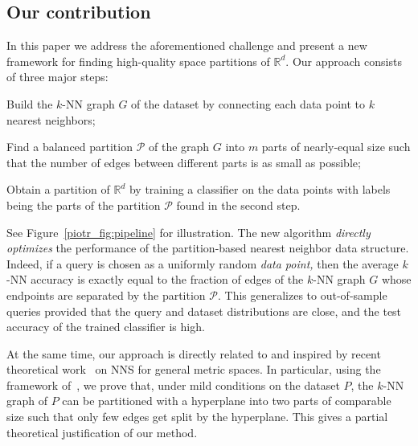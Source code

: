 \documentclass[11pt]{article}
\begin{document}
\subsection{Our contribution}

In this paper we address the aforementioned challenge and present a new framework for finding high-quality space partitions of $\mathbb{R}^d$.
Our approach consists of three major steps:
\begin{CompactEnumerate}
\item Build the $k$-NN graph $G$ of the dataset by connecting each data point to $k$ nearest neighbors;
\item Find a balanced partition $\mathcal{P}$ of the graph $G$ into $m$ parts of nearly-equal size such that the number of edges between different parts is as small as possible;
\item Obtain a partition of $\mathbb{R}^d$ by training a classifier on the data points with labels being the parts of the partition $\mathcal{P}$ found in the second step.
\end{CompactEnumerate}

See Figure~\ref{piotr_fig:pipeline} for illustration.
The new algorithm \emph{directly optimizes} the performance of the partition-based nearest neighbor data structure.
Indeed, if a query is chosen as a uniformly random \emph{data point,} then the average $k$-NN accuracy is exactly equal to the fraction of edges of the $k$-NN
graph $G$ whose endpoints are separated by the partition $\mathcal{P}$. This generalizes to out-of-sample queries provided that
the query and dataset distributions are close, and the test accuracy of the trained classifier is high.

At the same time, our approach is directly related to and inspired by recent theoretical work~\cite{andoni2018data,andoni2018holder} on NNS for general metric spaces.
In particular, using the framework of~\cite{andoni2018data,andoni2018holder}, we prove that, under mild conditions on the dataset $P$, the $k$-NN graph of $P$
can be partitioned with a hyperplane into two parts of comparable size such that only few edges get split by the hyperplane. This gives a partial theoretical justification of our method.
\end{document}
